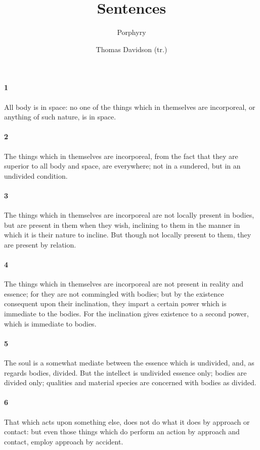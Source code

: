 \documentclass[12pt]{article}
\title{Sentences}
\author{Porphyry \and Thomas Davidson (tr.)}
\date{}
\begin{document}
\maketitle

\paragraph{1} All body is in space: no one of the things which in themselves are incorporeal, or anything of such nature, is in space.

\paragraph{2} The things which in themselves are incorporeal, from the fact that they are superior to all body and space, are everywhere; not in a sundered, but in an undivided condition.

\paragraph{3} The things which in themselves are incorporeal are not locally present in bodies, but are present in them when they wish, inclining to them in the manner in which it is their nature to incline. But though not locally present to them, they are present by relation.

\paragraph{4} The things which in themselves are incorporeal are not present in reality and essence; for they are not commingled with bodies; but by the existence consequent upon their inclination, they impart a certain power which is immediate to the bodies. For the inclination gives existence to a second power, which is immediate to bodies.

\paragraph{5} The soul is a somewhat mediate between the essence which is undivided, and, as regards bodies, divided. But the intellect is undivided essence only; bodies are divided only; qualities and material species are concerned with bodies as divided.

\paragraph{6} That which acts upon something else, does not do what it does by approach or contact: but even those things which do perform an action by approach and contact, employ approach by accident.
\end{document}
